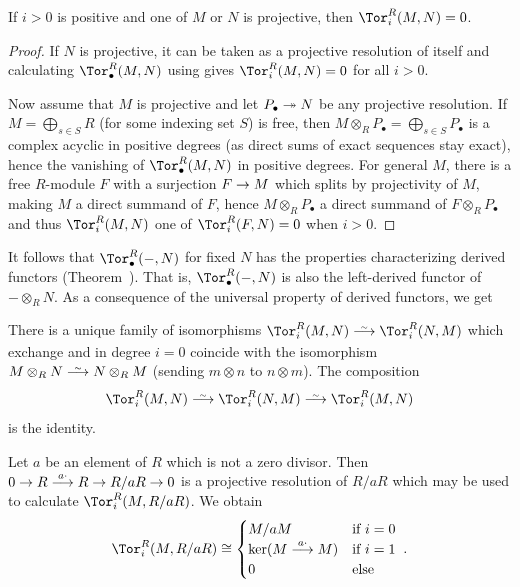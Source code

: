 \documentclass[a4paper,parskip=half,numbers=enddot, DIV=12]{scrreprt}
\begin{document}
\begin{fact}
	If $i>0$ is positive and one of $M$ or $N$ is projective, then $\Tor_i^R(M,N)=0$.
\end{fact}
\begin{proof}
	If $N$ is projective, it can be taken as a projective resolution of itself and calculating $\Tor_\bullet^R(M,N)$ using  gives $\Tor_i^R(M,N)=0$ for all $i>0$. 
	
	Now assume that $M$ is projective and let $P_\bullet \epimorphism N$ be any projective resolution. If $M=\bigoplus_{s\in S}R$ (for some indexing set $S$) is free, then $M\otimes_RP_\bullet=\bigoplus_{s\in S}P_\bullet$ is a complex acyclic in positive degrees (as direct sums of exact sequences stay exact), hence the vanishing of $\Tor_\bullet^R(M,N)$ in positive degrees. For general $M$, there is a free $R$-module $F$ with a surjection $F\morphism M$ which splits by projectivity of $M$, making $M$ a direct summand of $F$, hence $M\otimes_RP_\bullet$ a direct summand of $F\otimes_RP_\bullet$ and thus $\Tor_i^R(M,N)$ one of $\Tor_i^R(F,N)=0$ when $i>0$. 
\end{proof}
It follows that $\Tor_\bullet^R(-,N)$ for fixed $N$ has the properties characterizing derived functors (Theorem~). That is, $\Tor_\bullet^R(-,N)$ is also the left-derived functor of $-\otimes_RN$. As a consequence of the universal property of derived functors, we get
\begin{prop}
	There is a unique family of isomorphisms $\Tor_i^R(M,N)\isomorphism\Tor_i^R(N,M)$ which exchange  and  in degree $i=0$ coincide with the isomorphism $M\otimes_RN\isomorphism N\otimes_RM$ (sending $m\otimes n$ to $n\otimes m$). The composition
	\begin{align*}
		\Tor_i^R(M,N)\isomorphism \Tor_i^R(N,M)\isomorphism\Tor_i^R(M,N)
	\end{align*}
	is the identity.
\end{prop}
\begin{example}
	Let $a$ be an element of $R$ which is not a zero divisor. Then $0\morphism R\morphism[a\cdot ]R\morphism R/aR\morphism 0$ is a projective resolution of $R/aR$ which may be used to calculate $\Tor_i^R(M,R/aR)$. We obtain
	\begin{align*}
		\Tor_i^R(M,R/aR)\cong\begin{cases}
			M/aM & \text{if }i=0\\
			\ker(M\morphism[a\cdot ]M) & \text{if }i=1\\
			0 & \text{else}
		\end{cases}\;.
	\end{align*}
\end{example}
\end{document}
